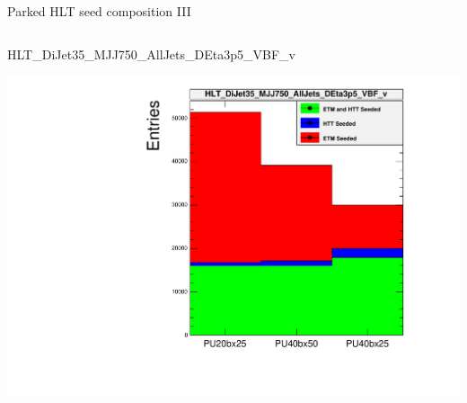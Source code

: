 \documentclass[8pt]{beamer}
\begin{document}
\begin{frame}{Parked HLT seed composition III}

\begin{columns}
 
\begin{block}{\footnotesize HLT\_DiJet35\_MJJ750\_AllJets\_DEta3p5\_VBF\_v}
\centering

\includegraphics[width=\linewidth]{fig/HLT_DiJet35_MJJ750_AllJets_DEta3p5_VBF_v.pdf}

\end{block}
  


\end{columns}

\end{frame}
\end{document}
